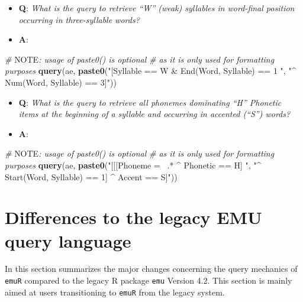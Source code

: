\documentclass[]{book}
\newenvironment{Shaded}{\begin{snugshade}}{\end{snugshade}}
\newcommand{\AlertTok}[1]{\textcolor[rgb]{0.94,0.16,0.16}{#1}}
\newcommand{\CommentTok}[1]{\textcolor[rgb]{0.56,0.35,0.01}{\textit{#1}}}
\newcommand{\KeywordTok}[1]{\textcolor[rgb]{0.13,0.29,0.53}{\textbf{#1}}}
\newcommand{\NormalTok}[1]{#1}
\newcommand{\StringTok}[1]{\textcolor[rgb]{0.31,0.60,0.02}{#1}}
\providecommand{\tightlist}{%
  \setlength{\itemsep}{0pt}\setlength{\parskip}{0pt}}
\theoremstyle{definition}
\theoremstyle{definition}
\theoremstyle{definition}
\theoremstyle{remark}
\begin{document}
\begin{itemize}
\tightlist
\item
  \textbf{Q}: \emph{What is the query to retrieve ``W'' (weak) syllables
  in word-final position occurring in three-syllable words?}
\item
  \textbf{A}:
\end{itemize}

\begin{Shaded}
\begin{Highlighting}[]
\CommentTok{# }\AlertTok{NOTE}\CommentTok{: usage of paste0() is optional}
\CommentTok{# as it is only used for formatting purposes}
\KeywordTok{query}\NormalTok{(ae, }\KeywordTok{paste0}\NormalTok{(}\StringTok{"[Syllable == W & End(Word, Syllable) == 1 "}\NormalTok{,}
                 \StringTok{"^ Num(Word, Syllable) == 3]"}\NormalTok{))}
\end{Highlighting}
\end{Shaded}

\begin{itemize}
\tightlist
\item
  \textbf{Q}: \emph{What is the query to retrieve all phonemes
  dominating ``H'' Phonetic items at the beginning of a syllable and
  occurring in accented (``S'') words?}
\item
  \textbf{A}:
\end{itemize}

\begin{Shaded}
\begin{Highlighting}[]
\CommentTok{# }\AlertTok{NOTE}\CommentTok{: usage of paste0() is optional}
\CommentTok{# as it is only used for formatting purposes}
\KeywordTok{query}\NormalTok{(ae, }\KeywordTok{paste0}\NormalTok{(}\StringTok{"[[[Phoneme =~ .* ^ Phonetic == H] "}\NormalTok{,}
                 \StringTok{"^ Start(Word, Syllable) == 1] ^ Accent == S]"}\NormalTok{))}
\end{Highlighting}
\end{Shaded}

\hypertarget{differences-to-the-legacy-emu-query-language}{%
\section{Differences to the legacy EMU query
language}\label{differences-to-the-legacy-emu-query-language}}

In this section summarizes the major changes concerning the query
mechanics of \texttt{emuR} compared to the legacy R package \texttt{emu}
Version 4.2. This section is mainly aimed at users transitioning to
\texttt{emuR} from the legacy system.
\end{document}
